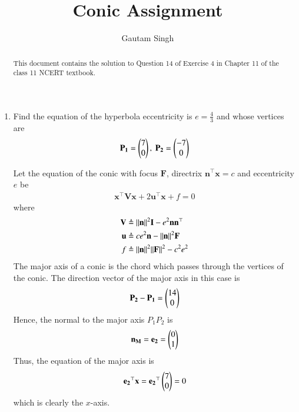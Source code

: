 \documentclass[journal,12pt,twocolumn]{IEEEtran}
\renewcommand{\vec}[1]{\boldsymbol{\mathbf{#1}}}
\begin{document}
\vspace{3cm}
\title{Conic Assignment}
\author{Gautam Singh}
\maketitle
\bigskip

\begin{abstract}
    This document contains the solution to Question 14 of Exercise 4 in Chapter
    11 of the class 11 NCERT textbook.
\end{abstract}

\begin{enumerate}
    \item Find the equation of the hyperbola eccentricity is $e = \frac{4}{3}$
    and whose vertices are
    \begin{align}
        \vec{P_1} = \myvec{7\\0},\ \vec{P_2} = \myvec{-7\\0}
        \label{eq:vert}
    \end{align}

    \solution Let the equation of the conic with focus $\vec{F}$, directrix
    $\vec{n}^\top\vec{x} = c$ and eccentricity $e$ be
    \begin{align}
        \vec{x}^\top\vec{V}\vec{x} + 2\vec{u}^\top\vec{x} + f = 0
        \label{eq:conic-def}
    \end{align}
    where
    \begin{align}
        \vec{V} &\triangleq \norm{\vec{n}}^2\vec{I} - e^2\vec{n}\vec{n}^\top \label{eq:V-def} \\
        \vec{u} &\triangleq ce^2\vec{n} - \norm{\vec{n}}^2\vec{F} \label{eq:u-def} \\
        f &\triangleq \norm{\vec{n}}^2\norm{\vec{F}}^2 - c^2e^2 \label{eq:f-def}
    \end{align}
    The major axis of a conic is the chord which passes through the vertices of the conic.
    The direction vector of the major axis in this case is
    \begin{align}
        \vec{P_2}-\vec{P_1} = \myvec{14\\0}
    \end{align}
    Hence, the normal to the major axis $P_1P_2$ is
    \begin{align}
        \vec{n_M} = \vec{e_2} = \myvec{0\\1}
    \end{align}
    Thus, the equation of the major axis is
    \begin{align}
        \vec{e_2}^\top\vec{x} = \vec{e_2}^\top\myvec{7\\0} = 0
    \end{align}
    which is clearly the $x$-axis.


\end{enumerate}
\end{document}
